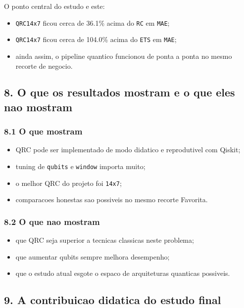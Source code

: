 \documentclass[12pt]{article}
\providecommand{\tightlist}{%
          \setlength{\itemsep}{0pt}\setlength{\parskip}{0pt}}
\begin{document}
O ponto central do estudo e este:

\begin{itemize}
\tightlist
\item
  \texttt{QRC14x7} ficou cerca de 36.1\% acima do \texttt{RC} em \texttt{MAE};
\item
  \texttt{QRC14x7} ficou cerca de 104.0\% acima do \texttt{ETS} em \texttt{MAE};
\item
  ainda assim, o pipeline quantico funcionou de ponta a ponta no mesmo recorte de negocio.
\end{itemize}

\subsection{8. O que os resultados mostram e o que eles nao mostram}\label{8-o-que-os-resultados-mostram-e-o-que-eles-nao-mostram}

\subsubsection{8.1 O que mostram}\label{81-o-que-mostram}

\begin{itemize}
\tightlist
\item
  QRC pode ser implementado de modo didatico e reprodutivel com Qiskit;
\item
  tuning de \texttt{qubits} e \texttt{window} importa muito;
\item
  o melhor QRC do projeto foi \texttt{14x7};
\item
  comparacoes honestas sao possiveis no mesmo recorte Favorita.
\end{itemize}

\subsubsection{8.2 O que nao mostram}\label{82-o-que-nao-mostram}

\begin{itemize}
\tightlist
\item
  que QRC seja superior a tecnicas classicas neste problema;
\item
  que aumentar qubits sempre melhora desempenho;
\item
  que o estudo atual esgote o espaco de arquiteturas quanticas possiveis.
\end{itemize}

\subsection{9. A contribuicao didatica do estudo final}\label{9-a-contribuicao-didatica-do-estudo-final}
\end{document}
